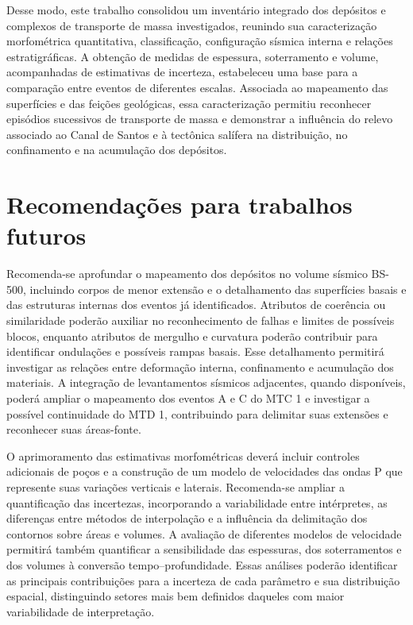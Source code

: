 Desse modo, este trabalho consolidou um inventário integrado dos depósitos e complexos de transporte de massa investigados, reunindo sua caracterização morfométrica quantitativa, classificação, configuração sísmica interna e relações estratigráficas. A obtenção de medidas de espessura, soterramento e volume, acompanhadas de estimativas de incerteza, estabeleceu uma base para a comparação entre eventos de diferentes escalas. Associada ao mapeamento das superfícies e das feições geológicas, essa caracterização permitiu reconhecer episódios sucessivos de transporte de massa e demonstrar a influência do relevo associado ao Canal de Santos e à tectônica salífera na distribuição, no confinamento e na acumulação dos depósitos.

\section{Recomendações para trabalhos futuros}\label{sec:7-1}

Recomenda-se aprofundar o mapeamento dos depósitos no volume sísmico BS-500, incluindo corpos de menor extensão e o detalhamento das superfícies basais e das estruturas internas dos eventos já identificados. Atributos de coerência ou similaridade poderão auxiliar no reconhecimento de falhas e limites de possíveis blocos, enquanto atributos de mergulho e curvatura poderão contribuir para identificar ondulações e possíveis rampas basais. Esse detalhamento permitirá investigar as relações entre deformação interna, confinamento e acumulação dos materiais. A integração de levantamentos sísmicos adjacentes, quando disponíveis, poderá ampliar o mapeamento dos eventos A e C do MTC 1 e investigar a possível continuidade do MTD 1, contribuindo para delimitar suas extensões e reconhecer suas áreas-fonte.

O aprimoramento das estimativas morfométricas deverá incluir controles adicionais de poços e a construção de um modelo de velocidades das ondas P que represente suas variações verticais e laterais. Recomenda-se ampliar a quantificação das incertezas, incorporando a variabilidade entre intérpretes, as diferenças entre métodos de interpolação e a influência da delimitação dos contornos sobre áreas e volumes. A avaliação de diferentes modelos de velocidade permitirá também quantificar a sensibilidade das espessuras, dos soterramentos e dos volumes à conversão tempo--profundidade. Essas análises poderão identificar as principais contribuições para a incerteza de cada parâmetro e sua distribuição espacial, distinguindo setores mais bem definidos daqueles com maior variabilidade de interpretação.

